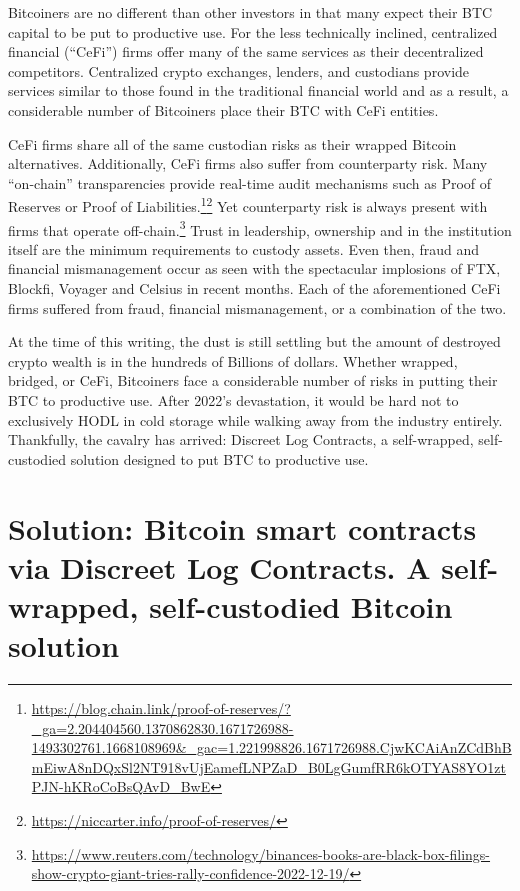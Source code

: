 \documentclass[twoside, a4paper, 11pt]{article}
\begin{document}
  Bitcoiners are no different than other investors in that many expect their BTC capital to be put to productive use. For the less technically inclined, centralized financial (“CeFi”) firms offer many of the same services as their decentralized competitors. Centralized crypto exchanges, lenders, and custodians provide services similar to those found in the traditional financial world and as a result, a considerable number of Bitcoiners place their BTC with CeFi entities.

  CeFi firms share all of the same custodian risks as their wrapped Bitcoin alternatives. Additionally, CeFi firms also suffer from counterparty risk. Many “on-chain” transparencies provide real-time audit mechanisms such as Proof of Reserves or Proof of Liabilities.\footnote{\url{https://blog.chain.link/proof-of-reserves/?_ga=2.204404560.1370862830.1671726988-1493302761.1668108969&_gac=1.221998826.1671726988.CjwKCAiAnZCdBhBmEiwA8nDQxSl2NT918vUjEamefLNPZaD_B0LgGumfRR6kOTYAS8YO1ztPJN-hKRoCoBsQAvD_BwE}}\footnote{\url{https://niccarter.info/proof-of-reserves/}} Yet counterparty risk is always present with firms that operate off-chain.\footnote{\url{https://www.reuters.com/technology/binances-books-are-black-box-filings-show-crypto-giant-tries-rally-confidence-2022-12-19/}} Trust in leadership, ownership and in the institution itself are the minimum requirements to custody assets. Even then, fraud and financial mismanagement occur as seen with the spectacular implosions of FTX, Blockfi, Voyager and Celsius in recent months. Each of the aforementioned CeFi firms suffered from fraud, financial mismanagement, or a combination of the two.

  At the time of this writing, the dust is still settling but the amount of destroyed crypto wealth is in the hundreds of Billions of dollars. Whether wrapped, bridged, or CeFi, Bitcoiners face a considerable number of risks in putting their BTC to productive use. After 2022’s devastation, it would be hard not to exclusively HODL in cold storage while walking away from the industry entirely. Thankfully, the cavalry has arrived: Discreet Log Contracts, a self-wrapped, self-custodied solution designed to put BTC to productive use.

  \section{Solution: Bitcoin smart contracts via Discreet Log Contracts. A self-wrapped, self-custodied Bitcoin solution}
\end{document}
